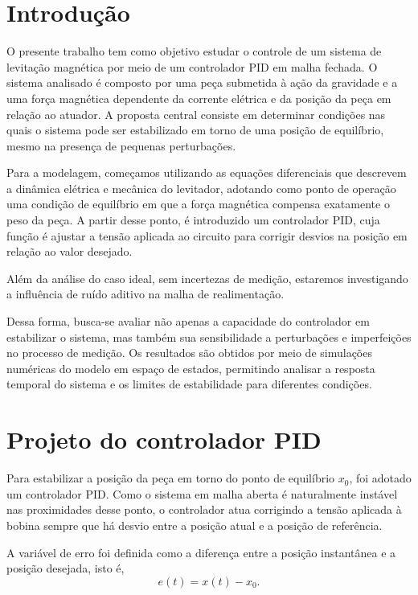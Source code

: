 \section{Introdução}

O presente trabalho tem como objetivo estudar o controle de um sistema de levitação magnética por meio de um controlador PID em malha fechada. O sistema analisado é composto por uma peça submetida à ação da gravidade e a uma força magnética dependente da corrente elétrica e da posição da peça em relação ao atuador. A proposta central consiste em determinar condições nas quais o sistema pode ser estabilizado em torno de uma posição de equilíbrio, mesmo na presença de pequenas perturbações.

Para a modelagem, começamos utilizando as equações diferenciais que descrevem a dinâmica elétrica e mecânica do   levitador, adotando como ponto de operação uma condição de equilíbrio em que a força magnética compensa exatamente o peso da peça. A partir desse ponto, é introduzido um controlador PID, cuja função é ajustar a tensão aplicada ao circuito para corrigir desvios na posição em relação ao valor desejado.

Além da análise do caso ideal, sem incertezas de medição, estaremos investigando a influência de  ruído aditivo na malha de realimentação. 

Dessa forma, busca-se avaliar não apenas a capacidade do controlador em estabilizar o sistema, mas também sua sensibilidade a perturbações e imperfeições no processo de medição. Os resultados são obtidos por meio de simulações numéricas do modelo em espaço de estados, permitindo analisar a resposta temporal do sistema e os limites de estabilidade para diferentes condições.

\section{Projeto do controlador PID}

Para estabilizar a posição da peça em torno do ponto de equilíbrio $x_0$, foi adotado um controlador PID. Como o sistema em malha aberta é naturalmente instável nas proximidades desse ponto, o controlador atua corrigindo a tensão aplicada à bobina sempre que há desvio entre a posição atual e a posição de referência.

A variável de erro foi definida como a diferença entre a posição instantânea e a posição desejada,
isto é,
  \[
  e(t) = x(t) - x_0.
  \]

